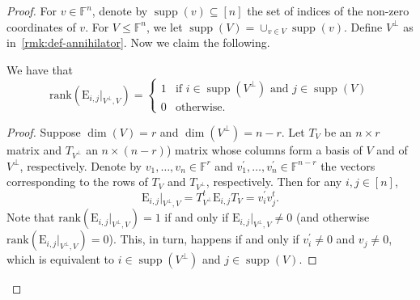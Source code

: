 \documentclass{toc}
\theoremstyle{plain}
\numberwithin{equation}{section}
\theoremstyle{definition}
\newcommand{\F}{\mathbb{F}}
\newcommand{\rk}{\mathrm{rank}}
\DeclareMathOperator{\supp}{supp}
\newcommand{\E}{\mathrm{E}}
\newcommand{\ann}{V^{\perp}}
\begin{document}
\begin{proof}
    For $v\in\F^n$, denote by $\supp(v)\subseteq[n]$ the set of indices of the non-zero coordinates of $v$. For $V\leq\F^{n}$, we let $\supp(V)=\cup_{v\in V}\supp(v)$. 
    Define $\ann$ as in~\cref{rmk:def-annihilator}. Now we claim the following.
    \begin{claim}\label{claim:rank-Eij}
        We have that
        \[
            \rk(\E_{i,j}|_{\ann,V}) = 
            \begin{cases}
                1&\text{if }i \in \supp(\ann)\text{ and } j \in \supp(V)\\
                0&\text{otherwise.}
            \end{cases}
        \]
    \end{claim}
    \begin{proof}
      Suppose $\dim(V)=r$ and $\dim(\ann)=n-r$. Let
%
%
$T_V$ be an $n\times r$ matrix and $T_{\ann}$ an $n\times (n-r)$) matrix whose
columns form a basis of $V$ and of $\ann$, respectively.  %
      Denote by $v_{1},\dots,v_{n}\in \F^r$ and $v^{\prime}_{1},\dots,v^{\prime}_{n}\in\F^{n-r}$ the vectors corresponding to the rows of $T_V$ and $T_{\ann}$, respectively. Then for any $i,j\in[n]$,
        $$
        \E_{i,j}|_{\ann,V}=T_{\ann}^t\E_{i,j}T_V={v^{\prime}_{i}}v_{j}^{t}.
        $$ 
        Note that $\rk(\E_{i,j}|_{\ann,V})=1$ if and only if $\E_{i,j}|_{\ann,V}\neq0$ (and otherwise $\rk(\E_{i,j}|_{\ann,V})=0$). This, in turn, happens if and only if $v^{\prime}_{i}\neq0$ and $v_{j}\neq0$, which is equivalent to $i\in\supp(\ann)$ and $j\in\supp(V)$. 
    \end{proof}


\end{proof}
\end{document}
